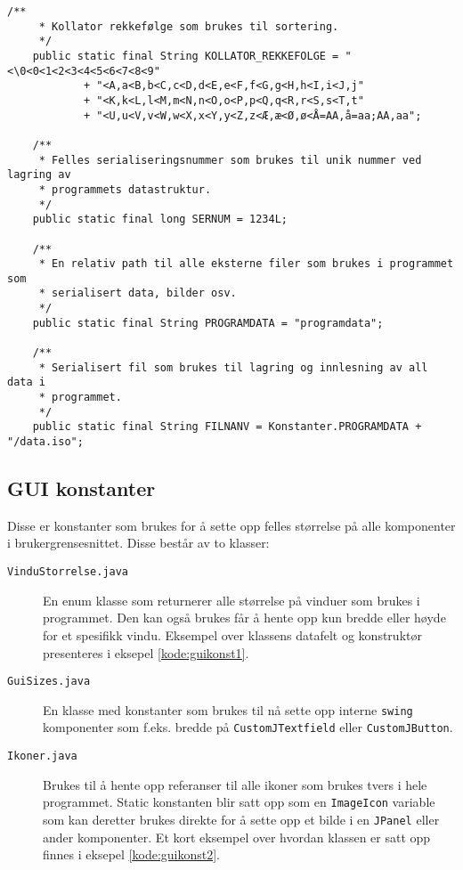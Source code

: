 \begin{lstlisting}[caption=Noen av static kosntanter som brukes i Konstanter klassen., label=kode:konst1]
    /**
     * Kollator rekkefølge som brukes til sortering.
     */
    public static final String KOLLATOR_REKKEFOLGE = "<\0<0<1<2<3<4<5<6<7<8<9"
            + "<A,a<B,b<C,c<D,d<E,e<F,f<G,g<H,h<I,i<J,j"
            + "<K,k<L,l<M,m<N,n<O,o<P,p<Q,q<R,r<S,s<T,t"
            + "<U,u<V,v<W,w<X,x<Y,y<Z,z<Æ,æ<Ø,ø<Å=AA,å=aa;AA,aa";

    /**
     * Felles serialiseringsnummer som brukes til unik nummer ved lagring av
     * programmets datastruktur.
     */
    public static final long SERNUM = 1234L;

    /**
     * En relativ path til alle eksterne filer som brukes i programmet som
     * serialisert data, bilder osv.
     */
    public static final String PROGRAMDATA = "programdata";

    /**
     * Serialisert fil som brukes til lagring og innlesning av all data i
     * programmet.
     */
    public static final String FILNANV = Konstanter.PROGRAMDATA + "/data.iso";
\end{lstlisting}

\subsection{GUI konstanter} \label{subsec:guikonst}
Disse er konstanter som brukes for å sette opp felles størrelse på alle komponenter i brukergrensesnittet. Disse består av to klasser:
\begin{description}

\item[\texttt{VinduStorrelse.java}]
En enum klasse som returnerer alle størrelse på vinduer som brukes i programmet. Den kan også brukes får å hente opp kun bredde eller høyde for et spesifikk vindu. Eksempel over klassens datafelt og  konstruktør presenteres i eksepel \ref{kode:guikonst1}. 

\item[\texttt{GuiSizes.java}]
En klasse med konstanter som brukes til nå sette opp interne \texttt{swing} komponenter som f.eks. bredde på \texttt{CustomJTextfield} eller \texttt{CustomJButton}.

\item[\texttt{Ikoner.java}]
Brukes til å hente opp referanser til alle ikoner som brukes tvers i hele programmet. Static konstanten blir satt opp som en \texttt{ImageIcon} variable som kan deretter brukes direkte for å sette opp et bilde i en \texttt{JPanel} eller ander komponenter. Et kort eksempel over hvordan klassen er satt opp finnes i eksepel \ref{kode:guikonst2}.
\end{description}

